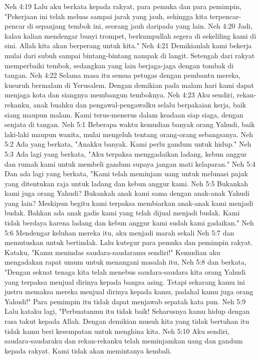 Neh 4:19  Lalu aku berkata kepada rakyat, para pemuka dan para pemimpin, "Pekerjaan ini telah meluas sampai jarak yang jauh, sehingga kita terpencar-pencar di sepanjang tembok ini, seorang jauh daripada yang lain.
Neh 4:20  Jadi, kalau kalian mendengar bunyi trompet, berkumpullah segera di sekeliling kami di sini. Allah kita akan berperang untuk kita."
Neh 4:21  Demikianlah kami bekerja mulai dari subuh sampai bintang-bintang nampak di langit. Setengah dari rakyat memperbaiki tembok, sedangkan yang lain berjaga-jaga dengan tombak di tangan.
Neh 4:22  Selama masa itu semua petugas dengan pembantu mereka, kusuruh bermalam di Yerusalem. Dengan demikian pada malam hari kami dapat menjaga kota dan siangnya membangun temboknya.
Neh 4:23  Aku sendiri, rekan-rekanku, anak buahku dan pengawal-pengawalku selalu berpakaian kerja, baik siang maupun malam. Kami terus-menerus dalam keadaan siap siaga, dengan senjata di tangan.
Neh 5:1  Beberapa waktu kemudian banyak orang Yahudi, baik laki-laki maupun wanita, mulai mengeluh tentang orang-orang sebangsanya.
Neh 5:2  Ada yang berkata, "Anakku banyak. Kami perlu gandum untuk hidup."
Neh 5:3  Ada lagi yang berkata, "Aku terpaksa menggadaikan ladang, kebun anggur dan rumah kami untuk membeli gandum supaya jangan mati kelaparan."
Neh 5:4  Dan ada lagi yang berkata, "Kami telah meminjam uang untuk melunasi pajak yang ditentukan raja untuk ladang dan kebun anggur kami.
Neh 5:5  Bukankah kami juga orang Yahudi? Bukankah anak kami sama dengan anak-anak Yahudi yang lain? Meskipun begitu kami terpaksa membiarkan anak-anak kami menjadi budak. Bahkan ada anak gadis kami yang telah dijual menjadi budak. Kami tidak berdaya karena ladang dan kebun anggur kami sudah kami gadaikan."
Neh 5:6  Mendengar keluhan mereka itu, aku menjadi marah sekali
Neh 5:7  dan memutuskan untuk bertindak. Lalu kutegur para pemuka dan pemimpin rakyat. Kataku, "Kamu menindas saudara-saudaramu sendiri!" Kemudian aku mengadakan rapat umum untuk menangani masalah itu,
Neh 5:8  dan berkata, "Dengan sekuat tenaga kita telah menebus saudara-saudara kita orang Yahudi yang terpaksa menjual dirinya kepada bangsa asing. Tetapi sekarang kamu ini justru memaksa mereka menjual dirinya kepada kamu, padahal kamu juga orang Yahudi!" Para pemimpin itu tidak dapat menjawab sepatah kata pun.
Neh 5:9  Lalu kataku lagi, "Perbuatanmu itu tidak baik! Seharusnya kamu hidup dengan rasa takut kepada Allah. Dengan demikian musuh kita yang tidak bertuhan itu tidak kamu beri kesempatan untuk menghina kita.
Neh 5:10  Aku sendiri, saudara-saudaraku dan rekan-rekanku telah meminjamkan uang dan gandum kepada rakyat. Kami tidak akan memintanya kembali.

